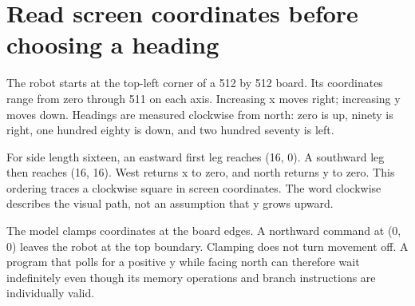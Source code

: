 \section{Read screen coordinates before choosing a
  heading}\label{006-marsbot-square-p01-read-screen-coordinates-before-choosing-a-heading}

The robot starts at the top-left corner of a 512 by 512 board. Its
coordinates range from zero through 511 on each axis. Increasing x moves
right; increasing y moves down. Headings are measured clockwise from
north: zero is up, ninety is right, one hundred eighty is down, and two
hundred seventy is left.

For side length sixteen, an eastward first leg reaches (16, 0). A
southward leg then reaches (16, 16). West returns x to zero, and north
returns y to zero. This ordering traces a clockwise square in screen
coordinates. The word clockwise describes the visual path, not an
assumption that y grows upward.

The model clamps coordinates at the board edges. A northward command at
(0, 0) leaves the robot at the top boundary. Clamping does not turn
movement off. A program that polls for a positive y while facing north
can therefore wait indefinitely even though its memory operations and
branch instructions are individually valid.
